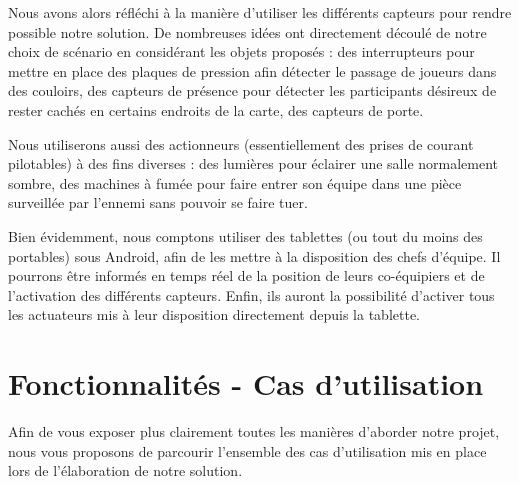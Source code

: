 Nous avons alors réfléchi à la manière d'utiliser les différents capteurs pour rendre possible notre solution. De nombreuses idées ont directement découlé de notre choix de scénario en considérant les objets proposés : des interrupteurs pour mettre en place des plaques de pression afin détecter le passage de joueurs dans des couloirs, des capteurs de présence pour détecter les participants désireux de rester cachés en certains endroits de la carte, des capteurs de porte. 

Nous utiliserons aussi des actionneurs (essentiellement des prises de courant pilotables) à des fins diverses : des lumières pour éclairer une salle normalement sombre, des machines à fumée pour faire entrer son équipe dans une pièce surveillée par l'ennemi sans pouvoir se faire tuer.

Bien évidemment, nous comptons utiliser des tablettes (ou tout du moins des portables) sous Android, afin de les mettre à la disposition des chefs d'équipe. Il pourrons être informés en temps réel de la position de leurs co-équipiers et de l'activation des différents capteurs. Enfin, ils auront la possibilité d'activer tous les actuateurs mis à leur disposition directement depuis la tablette.


\section{Fonctionnalités - Cas d'utilisation}

Afin de vous exposer plus clairement toutes les manières d'aborder notre projet, nous vous proposons de parcourir l'ensemble des cas d'utilisation mis en place lors de l'élaboration de notre solution.


